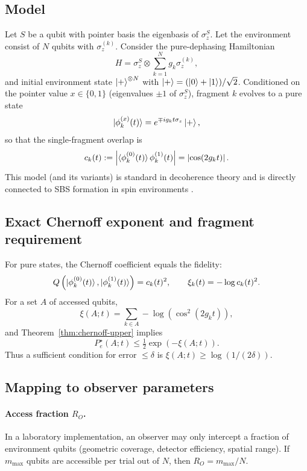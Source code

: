 \documentclass[11pt]{article}
\newcommand{\1}{\mathbf{1}}
\newcommand{\QCBcoef}{Q}
\newcommand{\QCBdist}{\xi}
\theoremstyle{definition}
\theoremstyle{plain}
\begin{document}
\subsection{Model}

Let $S$ be a qubit with pointer basis the eigenbasis of $\sigma_z^S$.
Let the environment consist of $N$ qubits with $\sigma_z^{(k)}$.
Consider the pure-dephasing Hamiltonian
\begin{equation}
H = \sigma_z^S \otimes \sum_{k=1}^N g_k \sigma_z^{(k)},
\label{eq:centralspin-H}
\end{equation}
and initial environment state $\ket{+}^{\otimes N}$ with $\ket{+}=(\ket{0}+\ket{1})/\sqrt{2}$.
Conditioned on the pointer value $x\in\{0,1\}$ (eigenvalues $\pm1$ of $\sigma_z^S$), fragment $k$ evolves to a pure state
\[
\ket{\phi_k^{(x)}(t)} = e^{\mp i g_k t \sigma_z}\ket{+},
\]
so that the single-fragment overlap is
\begin{equation}
c_k(t):=\left|\braket{\phi_k^{(0)}(t)}{\phi_k^{(1)}(t)}\right|=\left|\cos(2 g_k t)\right|.
\label{eq:ck}
\end{equation}
This model (and its variants) is standard in decoherence theory and is directly connected to SBS formation in spin environments \citep{KorbiczReview2021,RoszakKorbicz2019,ZwolakRiedelZurek2016}.

\subsection{Exact Chernoff exponent and fragment requirement}

For pure states, the Chernoff coefficient equals the fidelity:
\[
\QCBcoef\left(\ket{\phi_k^{(0)}(t)},\ket{\phi_k^{(1)}(t)}\right)=c_k(t)^2,
\qquad
\QCBdist_k(t)=-\log c_k(t)^2.
\]
For a set $A$ of accessed qubits,
\begin{equation}
\QCBdist(A;t)=\sum_{k\in A} -\log\left(\cos^2(2 g_k t)\right),
\label{eq:xi-centralspin}
\end{equation}
and Theorem~\ref{thm:chernoff-upper} implies
\[
P_e^\star(A;t)\le \tfrac12 \exp\!\left(-\QCBdist(A;t)\right).
\]
Thus a sufficient condition for error $\le\delta$ is $\QCBdist(A;t)\ge \log(1/(2\delta))$.

\subsection{Mapping to observer parameters}

\paragraph{Access fraction $R_O$.}
In a laboratory implementation, an observer may only intercept a fraction of environment qubits (geometric coverage, detector efficiency, spatial range).
If $m_{\max}$ qubits are accessible per trial out of $N$, then $R_O=m_{\max}/N$.
\end{document}
